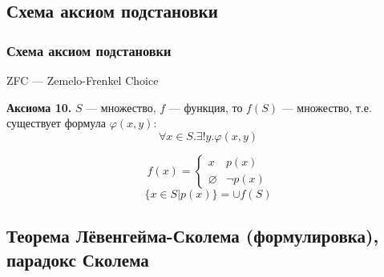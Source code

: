 \documentclass[english]{article}
\begin{document}
\subsection{Схема аксиом подстановки}
\label{sec:org2a874b2}
\subsubsection{Схема аксиом подстановки}
\label{sec:org6285305}
ZFC --- Zemelo-Frenkel Choice \\
\begin{axiom*}{\bf Аксиома 10.}
	\(S\) --- множество, \(f\) --- функция, то \(f(S)\) --- множество, т.е. существует формула \(\varphi(x, y)\):
	\[\forall x \in S. \exists ! y. \varphi(x, y)\]
\end{axiom*}
\begin{examp}
	\[ f(x) = \begin{cases} {x} & p(x) \\ \varnothing & \neg p(x) \end{cases} \]
	\[ \{x \in S | p(x)\} = \cup f(S) \]
\end{examp}
\subsection{Теорема Лёвенгейма-Сколема (формулировка), парадокс Сколема}
\label{sec:org307ab4e}
\end{document}
